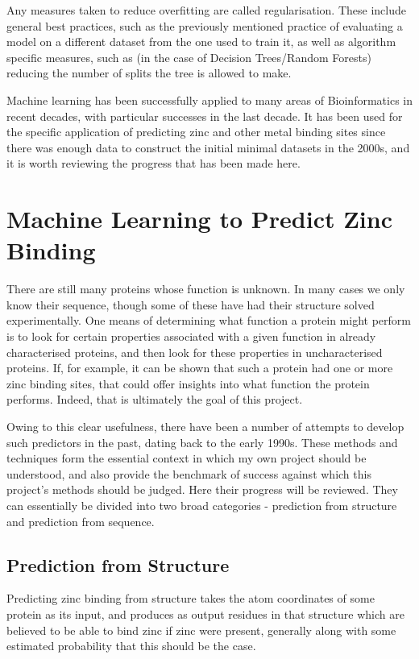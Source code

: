 Any measures taken to reduce overfitting are called regularisation. These include general best practices, such as the previously mentioned practice of evaluating a model on a different dataset from the one used to train it, as well as algorithm specific measures, such as (in the case of Decision Trees/Random Forests) reducing the number of splits the tree is allowed to make.

Machine learning has been successfully applied to many areas of Bioinformatics in recent decades, with particular successes in the last decade. It has been used for the specific application of predicting zinc and other metal binding sites since there was enough data to construct the initial minimal datasets in the 2000s, and it is worth reviewing the progress that has been made here.

\section{Machine Learning to Predict Zinc Binding}

There are still many proteins whose function is unknown. In many cases we only know their sequence, though some of these have had their structure solved experimentally. One means of determining what function a protein might perform is to look for certain properties associated with a given function in already characterised proteins, and then look for these properties in uncharacterised proteins. If, for example, it can be shown that such a protein had one or more zinc binding sites, that could offer insights into what function the protein performs. Indeed, that is ultimately the goal of this project.

Owing to this clear usefulness, there have been a number of attempts to develop such predictors in the past, dating back to the early 1990s. These methods and techniques form the essential context in which my own project should be understood, and also provide the benchmark of success against which this project's methods should be judged. Here their progress will be reviewed. They can essentially be divided into two broad categories - prediction from structure and prediction from sequence.

\subsection{Prediction from Structure}

Predicting zinc binding from structure takes the atom coordinates of some protein as its input, and produces as output residues in that structure which are believed to be able to bind zinc if zinc were present, generally along with some estimated probability that this should be the case.

